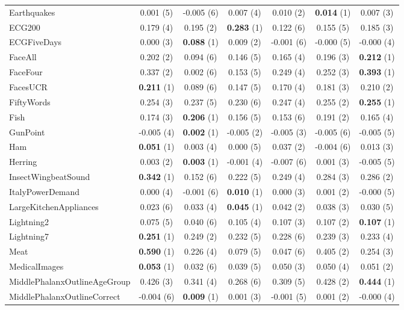 \begin{table}[ht]
\begin{adjustbox}{width=\textwidth}
\begin{tabular}{lcccccc}
Earthquakes & 0.001 (5) & -0.005 (6) & 0.007 (4) & 0.010 (2) & \textbf{0.014} (1) & 0.007 (3) \\
ECG200 & 0.179 (4) & 0.195 (2) & \textbf{0.283} (1) & 0.122 (6) & 0.155 (5) & 0.185 (3) \\
ECGFiveDays & 0.000 (3) & \textbf{0.088} (1) & 0.009 (2) & -0.001 (6) & -0.000 (5) & -0.000 (4) \\
FaceAll & 0.202 (2) & 0.094 (6) & 0.146 (5) & 0.165 (4) & 0.196 (3) & \textbf{0.212} (1) \\
FaceFour & 0.337 (2) & 0.002 (6) & 0.153 (5) & 0.249 (4) & 0.252 (3) & \textbf{0.393} (1) \\
FacesUCR & \textbf{0.211} (1) & 0.089 (6) & 0.147 (5) & 0.170 (4) & 0.181 (3) & 0.210 (2) \\
FiftyWords & 0.254 (3) & 0.237 (5) & 0.230 (6) & 0.247 (4) & 0.255 (2) & \textbf{0.255} (1) \\
Fish & 0.174 (3) & \textbf{0.206} (1) & 0.156 (5) & 0.153 (6) & 0.191 (2) & 0.165 (4) \\
GunPoint & -0.005 (4) & \textbf{0.002} (1) & -0.005 (2) & -0.005 (3) & -0.005 (6) & -0.005 (5) \\
Ham & \textbf{0.051} (1) & 0.003 (4) & 0.000 (5) & 0.037 (2) & -0.004 (6) & 0.013 (3) \\
Herring & 0.003 (2) & \textbf{0.003} (1) & -0.001 (4) & -0.007 (6) & 0.001 (3) & -0.005 (5) \\
InsectWingbeatSound & \textbf{0.342} (1) & 0.152 (6) & 0.222 (5) & 0.249 (4) & 0.284 (3) & 0.286 (2) \\
ItalyPowerDemand & 0.000 (4) & -0.001 (6) & \textbf{0.010} (1) & 0.000 (3) & 0.001 (2) & -0.000 (5) \\
LargeKitchenAppliances & 0.023 (6) & 0.033 (4) & \textbf{0.045} (1) & 0.042 (2) & 0.038 (3) & 0.030 (5) \\
Lightning2 & 0.075 (5) & 0.040 (6) & 0.105 (4) & 0.107 (3) & 0.107 (2) & \textbf{0.107} (1) \\
Lightning7 & \textbf{0.251} (1) & 0.249 (2) & 0.232 (5) & 0.228 (6) & 0.239 (3) & 0.233 (4) \\
Meat & \textbf{0.590} (1) & 0.226 (4) & 0.079 (5) & 0.047 (6) & 0.405 (2) & 0.254 (3) \\
MedicalImages & \textbf{0.053} (1) & 0.032 (6) & 0.039 (5) & 0.050 (3) & 0.050 (4) & 0.051 (2) \\
MiddlePhalanxOutlineAgeGroup & 0.426 (3) & 0.341 (4) & 0.268 (6) & 0.309 (5) & 0.428 (2) & \textbf{0.444} (1) \\
MiddlePhalanxOutlineCorrect & -0.004 (6) & \textbf{0.009} (1) & 0.001 (3) & -0.001 (5) & 0.001 (2) & -0.000 (4) \\

\end{tabular}
\end{adjustbox}
\end{table}
